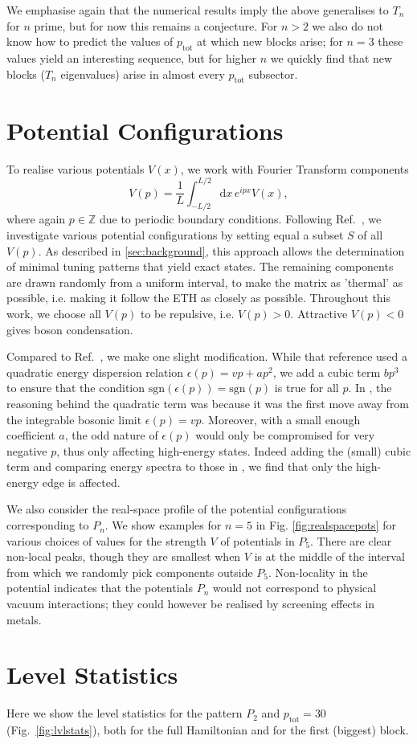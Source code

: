 \documentclass[aps,prx,10pt,twocolumn,amsmath,amssymb,superscriptaddress]{revtex4-2}
\newcommand{\sgn}{\text{sgn}}
\newcommand{\ptot}{p_{\mathrm{tot}}}
\theoremstyle{definition}
\theoremstyle{definition}
\begin{document}
We emphasise again that the numerical results imply the above generalises to $T_n$ for $n$ prime, but for now this remains a conjecture. For $n>2$ we also do not know how to predict the values of $\ptot$ at which new blocks arise; for $n=3$ these values yield an interesting sequence, but for higher $n$ we quickly find that new blocks ($T_n$ eigenvalues) arise in almost every $\ptot$ subsector.

\section{Potential Configurations}
\label{appendix:potconfigs}
To realise various potentials $V(x)$, we work with Fourier Transform components
\begin{equation}
V(p) = \frac{1}{L}\int_{-L/2}^{L/2} \mathrm{d} x \, e^{ipx}V(x),
\end{equation}
where again $p \in \mathbb{Z}$ due to periodic boundary conditions. Following Ref.~, we investigate various potential configurations by setting equal a subset $S$ of all $V(p)$. As described in \ref{sec:background}, this approach allows the determination of minimal tuning patterns that yield exact states. The remaining components are drawn randomly from a uniform interval, to make the matrix as 'thermal' as possible, i.e. making it follow the ETH as closely as possible. 
Throughout this work, we choose all $V(p)$ to be repulsive, i.e. $V(p) > 0$. Attractive $V(p) < 0$ gives boson condensation.

Compared to Ref.~, we make one slight modification. While that reference used a quadratic energy dispersion relation $\epsilon(p) = vp + ap^2$, we add a cubic term $bp^3$ to ensure that the condition $\sgn(\epsilon(p)) = \sgn(p)$ is true for all $p$. In \cite{Schindler_2022}, the reasoning behind the quadratic term was because it was the first move away from the integrable bosonic limit $\epsilon(p) = vp$. Moreover, with a small enough coefficient $a$, the odd nature of $\epsilon(p)$ would only be compromised for very negative $p$, thus only affecting high-energy states. Indeed adding the (small) cubic term and comparing energy spectra to those in \cite{Schindler_2022}, we find that only the high-energy edge is affected. 

We also consider the real-space profile of the potential configurations corresponding to $P_n$. We show examples for $n=5$ in Fig. \ref{fig:realspacepots} for various choices of values for the strength $V$ of potentials in $P_5$. There are clear non-local peaks, though they are smallest when $V$ is at the middle of the interval from which we randomly pick components outside $P_5$. Non-locality in the potential indicates that the potentials $P_n$ would not correspond to physical vacuum interactions; they could however be realised by screening effects in metals.

\section{Level Statistics}
\label{appendix:LevelStats}
Here we show the level statistics for the pattern $P_2$ and $\ptot = 30$ (Fig.~\ref{fig:lvlstats}), both for the full Hamiltonian and for the first (biggest) block. 
\end{document}
